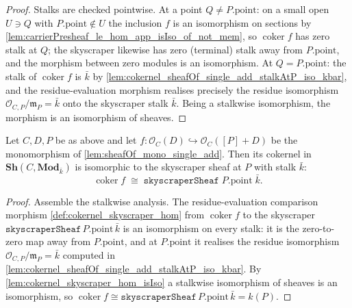 \begin{proof}
  Stalks are checked pointwise. At a point \(Q \neq P.\mathrm{point}\): on a
  small open \(U \ni Q\) with \(P.\mathrm{point} \notin U\) the inclusion \(f\) is
  an isomorphism on sections by
  \cref{lem:carrierPresheaf_le_hom_app_isIso_of_not_mem}, so \(\operatorname{coker}
  f\) has zero stalk at \(Q\); the skyscraper likewise has zero (terminal) stalk
  away from \(P.\mathrm{point}\), and the morphism between zero modules is an
  isomorphism. At \(Q = P.\mathrm{point}\): the stalk of \(\operatorname{coker}
  f\) is \(\bar k\) by
  \cref{lem:cokernel_sheafOf_single_add_stalkAtP_iso_kbar}, and the
  residue-evaluation morphism realises precisely the residue isomorphism
  \(\mathcal O_{C,P}/\mathfrak m_P = \bar k\) onto the skyscraper stalk
  \(\bar k\). Being a stalkwise isomorphism, the morphism is an isomorphism of
  sheaves.
\end{proof}

\begin{lemma}

  \label{lem:cokernel_sheafOf_single_add_iso_skyscraper}
  Let \(C, D, P\) be as above and let
  \(f : \mathcal O_C(D) \hookrightarrow \mathcal O_C([P]+D)\) be the
  monomorphism of \cref{lem:sheafOf_mono_single_add}. Then its cokernel in
  \(\mathbf{Sh}(C, \mathbf{Mod}_{\bar k})\) is isomorphic to the skyscraper
  sheaf at \(P\) with stalk \(\bar k\):
  \[
    \operatorname{coker} f \;\cong\;
    \texttt{skyscraperSheaf}\;P.\mathrm{point}\;\bar k.
  \]
\end{lemma}

\begin{proof}
  Assemble the stalkwise analysis. The residue-evaluation comparison morphism
  \cref{def:cokernel_skyscraper_hom} from \(\operatorname{coker} f\) to the
  skyscraper \(\texttt{skyscraperSheaf}\,P.\mathrm{point}\,\bar k\) is an
  isomorphism on every stalk: it is the zero-to-zero map away from
  \(P.\mathrm{point}\), and at \(P.\mathrm{point}\) it realises the residue
  isomorphism \(\mathcal O_{C,P}/\mathfrak m_P = \bar k\) computed in
  \cref{lem:cokernel_sheafOf_single_add_stalkAtP_iso_kbar}. By
  \cref{lem:cokernel_skyscraper_hom_isIso} a stalkwise isomorphism of sheaves is
  an isomorphism, so \(\operatorname{coker} f \cong
  \texttt{skyscraperSheaf}\,P.\mathrm{point}\,\bar k = k(P)\).
\end{proof}

